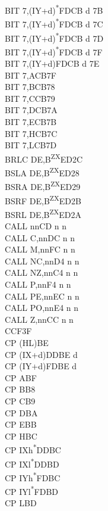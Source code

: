 \documentclass[twoside,openright,a4paper]{book}
\begin{document}
\begin{multicols}{3}
{\begin{tabbing}
	BIT 7,(IY+d)\textsuperscript{*}\>FDCB d 7B\\
	BIT 7,(IY+d)\textsuperscript{*}\>FDCB d 7C\\
	BIT 7,(IY+d)\textsuperscript{*}\>FDCB d 7D\\
	BIT 7,(IY+d)\textsuperscript{*}\>FDCB d 7F\\
	BIT 7,(IY+d)\>FDCB d 7E\\
	BIT 7,A\>CB7F\\
	BIT 7,B\>CB78\\
	BIT 7,C\>CB79\\
	BIT 7,D\>CB7A\\
	BIT 7,E\>CB7B\\
	BIT 7,H\>CB7C\\
	BIT 7,L\>CB7D\\
	BRLC DE,B\textsuperscript{ZX}\>ED2C\\
	BSLA DE,B\textsuperscript{ZX}\>ED28\\
	BSRA DE,B\textsuperscript{ZX}\>ED29\\
	BSRF DE,B\textsuperscript{ZX}\>ED2B\\
	BSRL DE,B\textsuperscript{ZX}\>ED2A\\
	CALL nn\>CD n n\\
	CALL C,nn\>DC n n\\
	CALL M,nn\>FC n n\\
	CALL NC,nn\>D4 n n\\
	CALL NZ,nn\>C4 n n\\
	CALL P,nn\>F4 n n\\
	CALL PE,nn\>EC n n\\
	CALL PO,nn\>E4 n n\\
	CALL Z,nn\>CC n n\\
	CCF\>3F\\
	CP (HL)\>BE\\
	CP (IX+d)\>DDBE d\\
	CP (IY+d)\>FDBE d\\
	CP A\>BF\\
	CP B\>B8\\
	CP C\>B9\\
	CP D\>BA\\
	CP E\>BB\\
	CP H\>BC\\
	CP IXh\textsuperscript{*}\>DDBC\\
	CP IXl\textsuperscript{*}\>DDBD\\
	CP IYh\textsuperscript{*}\>FDBC\\
	CP IYl\textsuperscript{*}\>FDBD\\
	CP L\>BD\\

\end{tabbing}}
\end{multicols}
\end{document}

